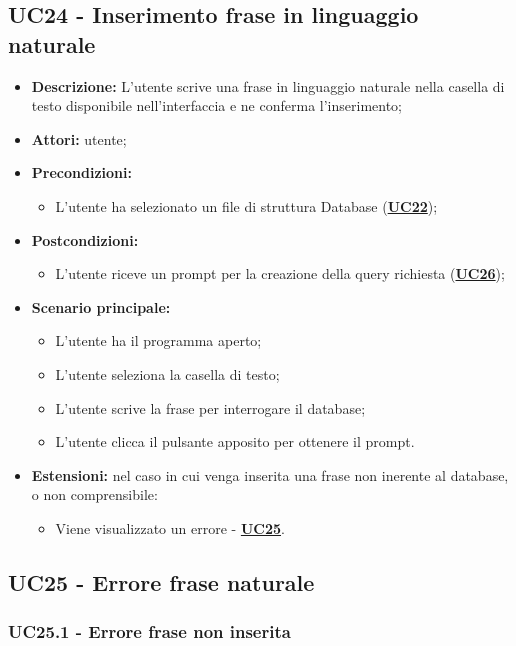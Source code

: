 \subsection{UC24 - Inserimento frase in linguaggio naturale}
\label{sec:UC24}
\begin{itemize}
	\item \textbf{Descrizione:} L’utente scrive una frase in linguaggio naturale nella casella di testo disponibile nell’interfaccia e ne conferma l’inserimento;
	\item \textbf{Attori:} utente;
	\item \textbf{Precondizioni:} 
	\begin{itemize}
		\item L’utente ha selezionato un file di struttura Database (\hyperref[sec:UC22]{\textbf{UC22}});
	\end{itemize}
	\item \textbf{Postcondizioni:} 
	\begin{itemize}
		\item L’utente riceve un prompt per la creazione della query richiesta (\hyperref[sec:UC26]{\textbf{UC26}});
	\end{itemize}
	\item \textbf{Scenario principale:} 
	\begin{itemize}
		\item L’utente ha il programma aperto;
		\item L’utente seleziona la casella di testo;
		\item L’utente scrive la frase per interrogare il database;
		\item L’utente clicca il pulsante apposito per ottenere il prompt.
	\end{itemize}
	\item \textbf{Estensioni:} nel caso in cui venga inserita una frase non inerente al database, o non comprensibile:
	\begin{itemize}
		\item Viene visualizzato un errore - \hyperref[sec:UC25]{\textbf{UC25}}.
	\end{itemize}
\end{itemize}

\subsection{UC25 - Errore frase naturale}
\label{sec:UC25}

\subsubsection{UC25.1 - Errore frase non inserita}
\label{sec:UC25.1}

